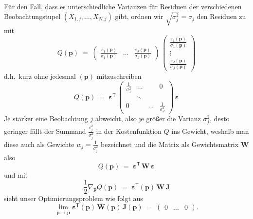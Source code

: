 Für den Fall, dass es unterschiedliche Varianzen für Residuen der verschiedenen Beobachtungstupel
$(X_{1,j},\dots,X_{N,j})$ gibt, ordnen wir $\sqrt{\sigma_j^2} = \sigma_j$ 
den Residuen zu mit
\begin{equation}
Q(\mathbf{p}) \; = \;
  \left(\begin{array}{ccc}
  \frac{\varepsilon_1(\mathbf{p})}{\sigma_1(\mathbf{p})} & \dots &
 \frac{\varepsilon_J(\mathbf{p})}{\sigma_J(\mathbf{p})} \end{array} \right)
\, \left(\begin{array}{c} \frac{\varepsilon_1(\mathbf{p})}{\sigma_1(\mathbf{p})}\\
 \vdots\\ \frac{\varepsilon_J(\mathbf{p})}{\sigma_J(\mathbf{p})}\end{array} \right)
\label{ZielfunktionalJmitW}
\end{equation}
d.h.\ kurz ohne jedesmal $(\mathbf{p})$ mitzuschreiben
\begin{equation}
Q(\mathbf{p}) \; = \;
  \boldsymbol{\varepsilon}^\textsf{T}
\, \left(\begin{array}{cccc} \frac{1}{\sigma_1^2} & \dots & & 0 \\
  & \ddots & \\
 0 & & \dots &  \frac{1}{\sigma_J^2} \end{array} \right) \, \boldsymbol{\varepsilon}
\label{ZielfunktionalJmitW1}
\end{equation}
Je stärker eine Beobachtung $j$ abweicht, also je größer die Varianz $\sigma_j^2$,
desto geringer fällt der Summand $\frac{\varepsilon_j^2}{\sigma_j^2}$ in der Kostenfunktion $Q$
ins Gewicht, weshalb man diese auch als Gewichte $w_j = \frac{1}{\sigma_j^2}$ bezeichnet
und die Matrix als Gewichtsmatrix $\mathbf{W}$ also
\begin{equation}
Q(\mathbf{p}) \; = \;
  \boldsymbol{\varepsilon}^\textsf{T}
\, \mathbf{W} \, \boldsymbol{\varepsilon}
\label{ZielfunktionalJmitW2}
\end{equation}
und mit
\begin{equation}
\frac{1}{2} \nabla_{\mathbf{p}} Q(\mathbf{p})  \; = \; \boldsymbol{\varepsilon}^\textsf{T}(\mathbf{p})
 \, \mathbf{W} \, \boldsymbol{J}
\label{ZielfunktionalGradJW}
\end{equation}
sieht unser Optimierungsproblem wie folgt aus
\begin{equation}
\lim_{\mathbf{p} \rightarrow \mathbf{\hat p}}
\boldsymbol{\varepsilon}^\textsf{T}(\mathbf{p})
 \, \mathbf{W}(\mathbf{p}) \, \boldsymbol{J}(\mathbf{p})
 \; = \; \left(\begin{array}{ccc} 0 & \dots & 0 \end{array}\right) .
\label{ZielfunktionalGrad1W}
\end{equation}
